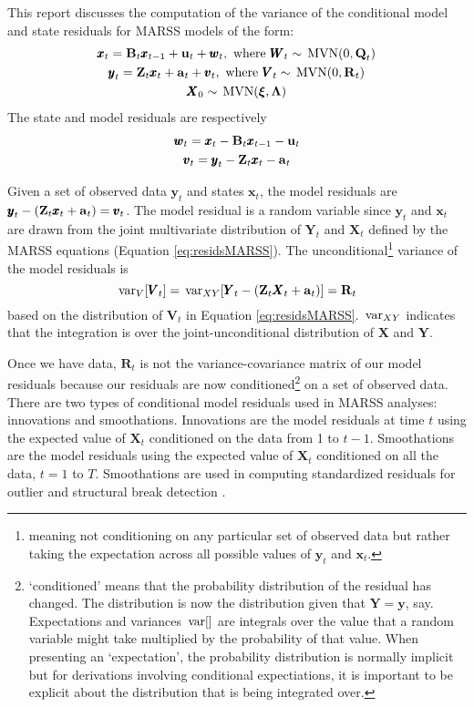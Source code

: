 \documentclass[]{article}
\def\xixi{\mbox{\boldmath $\xi$}}
\def\LAM{\mbox{\boldmath $\Lambda$}}
\def\UPS{\mbox{\boldmath $\Upsilon$}}
\def\XI{\mbox{\boldmath $\Xi$}}
\def\BB{\mbox{$\mathbf B$}}	\def\bb{\mbox{$\mathbf b$}} \def\Bb{\mbox{$\mathbf J$}} \def\Ba{\mbox{$\mathbf L$}} \def\Bm{\UPS}
\def\MVN{\,\textup{\textrm{MVN}}}
\def\QQ{\mbox{$\mathbf Q$}}	 \def\qq{\mbox{$\mathbf q$}} \def\Qb{\mbox{$\mathbf G$}}  \def\Qm{\mathbb{Q}}
\def\RR{\mbox{$\mathbf R$}}	 \def\rr{\mbox{$\mathbf r$}} \def\Rb{\mbox{$\mathbf H$}}	\def\Rm{\mathbb{R}}
\def\VV{\mbox{$\pmb{V}$}}	\def\vv{\mbox{$\pmb{v}$}}
\def\WW{\mbox{$\pmb{W}$}}	\def\ww{\mbox{$\pmb{w}$}}
\def\XX{\mbox{$\pmb{X}$}}	\def\xx{\mbox{$\pmb{x}$}}
\def\YY{\mbox{$\pmb{Y}$}}	\def\yy{\mbox{$\pmb{y}$}}
\def\ZZ{\mbox{$\mathbf Z$}}	\def\zz{\mbox{$\mathbf z$}}	\def\Zb{\mbox{$\mathbf M$}} \def\Za{\mbox{$\mathbf N$}} \def\Zm{\XI}
\def\var{\,\textup{\textrm{var}}}
\begin{document}
This report discusses the computation of the variance of the conditional model and state residuals for MARSS models of the  form:
\begin{equation}\label{eq:residsMARSS}
\begin{gathered}
\xx_t = \BB_t\xx_{t-1} + \uu_t + \ww_t, \text{ where } \WW_t \sim \MVN(0,\QQ_t)\\
\yy_t = \ZZ_t\xx_t + \aa_t + \vv_t, \text{ where } \VV_t \sim \MVN(0,\RR_t)\\
\XX_0 \sim \MVN(\xixi,\LAM)
\end{gathered}
\end{equation}
The state and model residuals are respectively
\begin{equation}\label{eq:resids}
\begin{gathered}
\ww_t = \xx_t - \BB_t\xx_{t-1} - \uu_t\\
\vv_t = \yy_t - \ZZ_t\xx_t - \aa_t
\end{gathered}
\end{equation}

Given a set of observed data $\yy_t$ and states $\xx_t$, the model residuals are $\yy_t - (\ZZ_t \xx_t + \aa_t)=\vv_t$.  The model residual is a random variable since $\yy_t$ and $\xx_t$ are drawn from the joint multivariate distribution of $\YY_t$ and $\XX_t$ defined by the MARSS equations (Equation \ref{eq:residsMARSS}).
The unconditional\footnote{meaning not conditioning on any particular set of observed data but rather taking the expectation across all possible values of $\yy_t$ and $\xx_t$.} variance of the model residuals is
\begin{equation}\label{eqn:unconditiondistofVt}
\var_V[\VV_t] = \var_{XY}[\YY_t - (\ZZ_t \XX_t + \aa_t)] = \RR_t\\
\end{equation}
based on the distribution of $\VV_t$ in Equation \ref{eq:residsMARSS}.  $\var_{XY}$ indicates that the integration is over the joint-unconditional distribution of $\XX$ and $\YY$.

Once we have data, $\RR_t$ is not the variance-covariance matrix of our model residuals because our residuals are now conditioned\footnote{`conditioned' means that the probability distribution of the residual has changed. The distribution is now the distribution given that $\YY=\yy$, say. Expectations and variances $\var[ ]$ are integrals over the value that a random variable might take multiplied by the probability of that value. When presenting an   `expectation', the probability distribution is normally implicit but for derivations involving conditional expectiations, it is important to be explicit about the distribution that is being integrated over.} on a set of observed data. There are two types of conditional model residuals used in MARSS analyses: innovations and smoothations.  Innovations are the model residuals at time $t$ using the expected value of $\XX_t$ conditioned on the data from 1 to $t-1$.  Smoothations  are the model residuals using the expected value of $\XX_t$ conditioned on all the data, $t=1$ to $T$.  Smoothations are used in computing standardized residuals for outlier and structural break detection \citep{Harveyetal1998, deJongPenzer1998, CommandeurKoopman2007}.  
\end{document}
